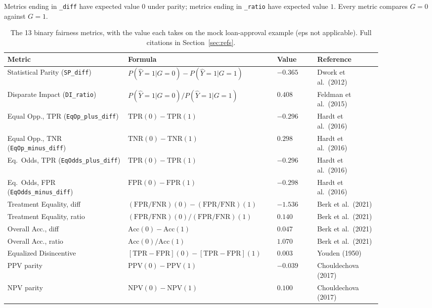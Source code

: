 \documentclass[11pt]{article}
\begin{document}
Metrics ending in \texttt{\_diff} have expected value $0$ under parity;
metrics ending in \texttt{\_ratio} have expected value $1$. Every metric
compares $G=0$ against $G=1$.

\begin{table}[h]
\centering
\small
\begin{tabular}{p{0.3\linewidth}p{0.32\linewidth}p{0.1\linewidth}p{0.16\linewidth}}
\toprule
Metric & Formula & Value & Reference \\
\midrule
Statistical Parity (\texttt{SP\_diff}) & $P(\hat Y{=}1|G{=}0)-P(\hat Y{=}1|G{=}1)$ & $-0.365$ & Dwork et al.\ (2012) \\
Disparate Impact (\texttt{DI\_ratio}) & $P(\hat Y{=}1|G{=}0)/P(\hat Y{=}1|G{=}1)$ & $0.408$ & Feldman et al.\ (2015) \\
Equal Opp., TPR (\texttt{EqOp\_plus\_diff}) & $\mathrm{TPR}(0)-\mathrm{TPR}(1)$ & $-0.296$ & Hardt et al.\ (2016) \\
Equal Opp., TNR (\texttt{EqOp\_minus\_diff}) & $\mathrm{TNR}(0)-\mathrm{TNR}(1)$ & $0.298$ & Hardt et al.\ (2016) \\
Eq.\ Odds, TPR (\texttt{EqOdds\_plus\_diff}) & $\mathrm{TPR}(0)-\mathrm{TPR}(1)$ & $-0.296$ & Hardt et al.\ (2016) \\
Eq.\ Odds, FPR (\texttt{EqOdds\_minus\_diff}) & $\mathrm{FPR}(0)-\mathrm{FPR}(1)$ & $-0.298$ & Hardt et al.\ (2016) \\
Treatment Equality, diff & $(\mathrm{FPR}/\mathrm{FNR})(0)-(\mathrm{FPR}/\mathrm{FNR})(1)$ & $-1.536$ & Berk et al.\ (2021) \\
Treatment Equality, ratio & $(\mathrm{FPR}/\mathrm{FNR})(0)/(\mathrm{FPR}/\mathrm{FNR})(1)$ & $0.140$ & Berk et al.\ (2021) \\
Overall Acc., diff & $\mathrm{Acc}(0)-\mathrm{Acc}(1)$ & $0.047$ & Berk et al.\ (2021) \\
Overall Acc., ratio & $\mathrm{Acc}(0)/\mathrm{Acc}(1)$ & $1.070$ & Berk et al.\ (2021) \\
Equalized Disincentive & $[\mathrm{TPR}{-}\mathrm{FPR}](0)-[\mathrm{TPR}{-}\mathrm{FPR}](1)$ & $0.003$ & Youden (1950) \\
PPV parity & $\mathrm{PPV}(0)-\mathrm{PPV}(1)$ & $-0.039$ & Chouldechova (2017) \\
NPV parity & $\mathrm{NPV}(0)-\mathrm{NPV}(1)$ & $0.100$ & Chouldechova (2017) \\
\bottomrule
\end{tabular}
\caption{The 13 binary fairness metrics, with the value each takes on the mock loan-approval example (eps not applicable). Full citations in Section~\ref{sec:refs}.}
\end{table}
\end{document}
